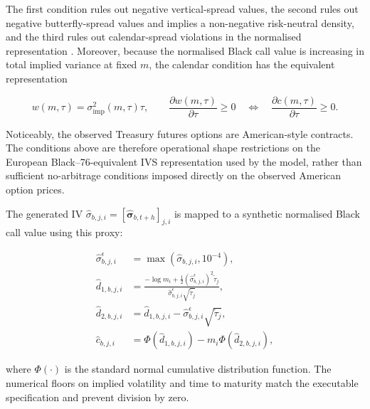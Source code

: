 The first condition rules out negative vertical-spread values, the second
rules out negative butterfly-spread values and implies a non-negative
risk-neutral density, and the third rules out calendar-spread violations in
the normalised representation \citep{breedenlitzenberger1978,gatheral2014arbitragefree}.
Moreover, because the normalised Black call value is increasing in total
implied variance at fixed \(m\), the calendar condition has the equivalent
representation

\begin{equation}
w(m,\tau)
=
\sigma_{\mathrm{imp}}^2(m,\tau)\tau,
\qquad
\frac{\partial w(m,\tau)}{\partial \tau}\geq 0
\quad\Longleftrightarrow\quad
\frac{\partial c(m,\tau)}{\partial \tau}\geq 0.
\label{eq:ch3:totalvariance}
\end{equation}

Noticeably, the observed Treasury futures options are American-style contracts. The
conditions above are therefore operational shape restrictions on the
European Black--76-equivalent IVS representation used by the model, rather
than sufficient no-arbitrage conditions imposed directly on the observed
American option prices.


The generated IV
\(\widehat{\sigma}_{b,j,i}=[\widehat{\boldsymbol{\sigma}}_{b,t+h}]_{j,i}\)
is mapped to a synthetic normalised Black call value using this proxy:

\begin{equation}
\begin{aligned}
\widehat{\sigma}^{\epsilon}_{b,j,i}
&=\max\!\left(\widehat{\sigma}_{b,j,i},10^{-4}\right),\\
\widehat d_{1,b,j,i}
&=
\frac{-\log m_i
      +\tfrac{1}{2}\left(\widehat{\sigma}^{\epsilon}_{b,j,i}\right)^2\widetilde{\tau}_j}
     {\widehat{\sigma}^{\epsilon}_{b,j,i}\sqrt{\widetilde{\tau}_j}},\\
\widehat d_{2,b,j,i}
&=\widehat d_{1,b,j,i}
  -\widehat{\sigma}^{\epsilon}_{b,j,i}\sqrt{\widetilde{\tau}_j},\\
\widehat c_{b,j,i}
&=\Phi\!\left(\widehat d_{1,b,j,i}\right)
  -m_i\Phi\!\left(\widehat d_{2,b,j,i}\right),
\end{aligned}
\label{eq:ch3:normalised_black_call}
\end{equation}

where \(\Phi(\cdot)\) is the standard normal cumulative distribution function. The numerical floors on implied volatility and time to maturity match the executable specification and prevent division by zero. 


